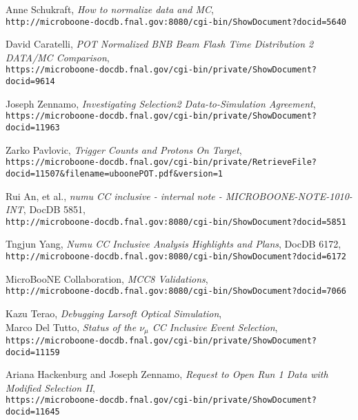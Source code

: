 \documentclass{article}
\begin{document}
\begin{thebibliography}{9}
 Anne Schukraft, \emph{How to normalize data and MC},\\
 \texttt{http://microboone-docdb.fnal.gov:8080/cgi-bin/ShowDocument?docid=5640}
 
  David Caratelli, \emph{POT Normalized BNB Beam Flash Time Distribution
2 DATA/MC Comparison},\\
  \texttt{https://microboone-docdb.fnal.gov/cgi-bin/private/ShowDocument?docid=9614}

  Joseph Zennamo, \emph{Investigating Selection2
Data-to-Simulation Agreement},\\
  \texttt{https://microboone-docdb.fnal.gov/cgi-bin/private/ShowDocument?docid=11963}

  Zarko Pavlovic, \emph{Trigger Counts and Protons On Target},\\
  \texttt{https://microboone-docdb.fnal.gov/cgi-bin/private/RetrieveFile?docid=11507\&filename=uboonePOT.pdf\&version=1}

  Rui An, et al., \emph{numu CC inclusive - internal note - MICROBOONE-NOTE-1010-INT}, DocDB 5851,\\
  \texttt{http://microboone-docdb.fnal.gov:8080/cgi-bin/ShowDocument?docid=5851}
 
  Tngjun Yang, \emph{Numu CC Inclusive Analysis Highlights and Plans}, DocDB 6172,\\
  \texttt{http://microboone-docdb.fnal.gov:8080/cgi-bin/ShowDocument?docid=6172}


 MicroBooNE Collaboration, \emph{MCC8 Validations},\\
 \texttt{http://microboone-docdb.fnal.gov:8080/cgi-bin/ShowDocument?docid=7066}

 Kazu Terao, \emph{Debugging Larsoft Optical Simulation},\\

 Marco Del Tutto, \emph{Status of the $\nu_\mu$ CC
Inclusive Event Selection},\\
 \texttt{https://microboone-docdb.fnal.gov/cgi-bin/private/ShowDocument?docid=11159}

 Ariana Hackenburg and Joseph Zennamo, \emph{Request to Open Run 1 Data with Modified Selection II},\\
 \texttt{https://microboone-docdb.fnal.gov/cgi-bin/private/ShowDocument?docid=11645}
 

\end{thebibliography}
\end{document}
